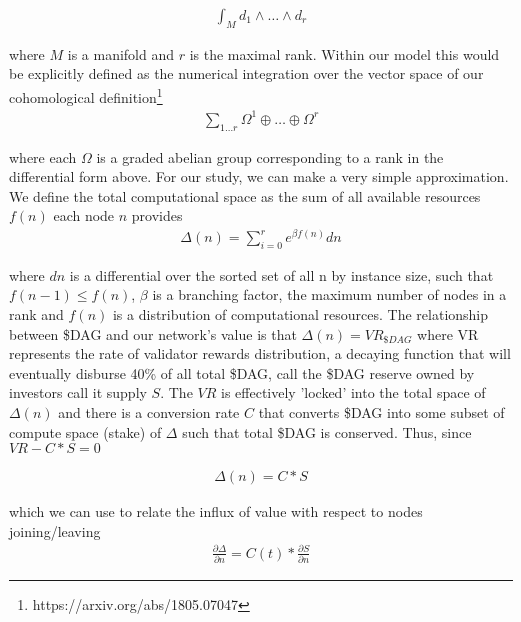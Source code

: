 \documentclass{article}
\begin{document}
\begin{equation*} \label{eq1}
\begin{split}
\int_M d_1\wedge \dots \wedge d_r
\end{split}
\end{equation*}

where $M$ is a manifold and $r$ is the maximal rank. Within our model this would be explicitly defined as the numerical integration over the vector space of our cohomological definition\footnote{https://arxiv.org/abs/1805.07047}
\begin{equation*} \label{eq1}
\begin{split}
\sum_{1 \dots r} \Omega^1 \oplus \dots \oplus \Omega^r
\end{split}
\end{equation*}

where each $\Omega$ is a graded abelian group corresponding to a rank in the differential form above. For our study, we can make a very simple approximation. We define the total computational space as the sum of all available resources $f(n)$ each node $n$ provides
\begin{equation*} \label{eq1}
\begin{split}
\Delta(n) = \sum_{i=0}^r e^{\beta f(n)} dn
\end{split}
\end{equation*}

where $dn$ is a differential over the sorted set of all n by instance size, such that $f(n-1) \leq f(n)$, $\beta$ is a branching factor, the maximum number of nodes in a rank and $f(n)$ is a distribution of computational resources. The relationship between \$DAG and our network's value is that $\Delta(n) = VR_{\$DAG}$ where VR represents the rate of validator rewards distribution, a decaying function that will eventually disburse 40\% of all total \$DAG, call the \$DAG reserve owned by investors call it supply $S$. The $VR$ is effectively 'locked' into the total space of $\Delta(n)$ and there is a conversion rate $C$ that converts \$DAG into some subset of compute space (stake) of $\Delta$ such that total \$DAG is conserved. Thus, since $VR - C*S = 0$ 

\begin{equation*} \label{eq1}
\begin{split}
\Delta(n) = C* S
\end{split}
\end{equation*}

which we can use to relate the influx of value with respect to nodes joining/leaving
\begin{equation*} \label{eq1}
\begin{split}
\frac{\partial \Delta}{\partial n} = C(t)* \frac{\partial S}{\partial n}
\end{split}
\end{equation*}
\end{document}
